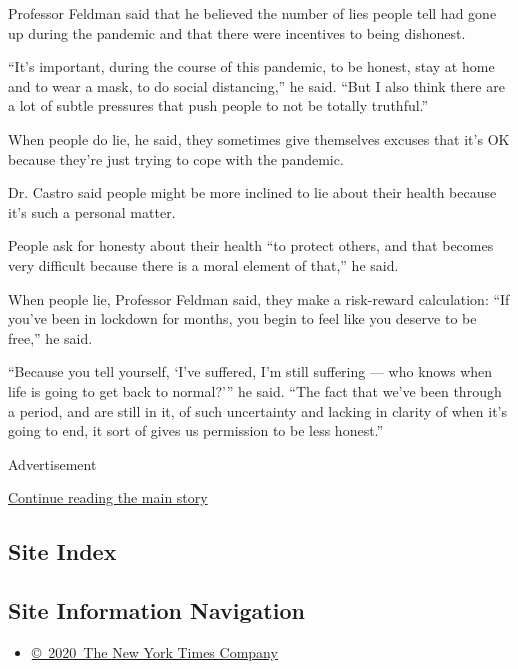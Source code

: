 Professor Feldman said that he believed the number of lies people tell
had gone up during the pandemic and that there were incentives to being
dishonest.

``It's important, during the course of this pandemic, to be honest, stay
at home and to wear a mask, to do social distancing,'' he said. ``But I
also think there are a lot of subtle pressures that push people to not
be totally truthful.''

When people do lie, he said, they sometimes give themselves excuses that
it's OK because they're just trying to cope with the pandemic.

Dr. Castro said people might be more inclined to lie about their health
because it's such a personal matter.

People ask for honesty about their health ``to protect others, and that
becomes very difficult because there is a moral element of that,'' he
said.

When people lie, Professor Feldman said, they make a risk-reward
calculation: ``If you've been in lockdown for months, you begin to feel
like you deserve to be free,'' he said.

``Because you tell yourself, `I've suffered, I'm still suffering --- who
knows when life is going to get back to normal?''' he said. ``The fact
that we've been through a period, and are still in it, of such
uncertainty and lacking in clarity of when it's going to end, it sort of
gives us permission to be less honest.''

Advertisement

\protect\hyperlink{after-bottom}{Continue reading the main story}

\hypertarget{site-index}{%
\subsection{Site Index}\label{site-index}}

\hypertarget{site-information-navigation}{%
\subsection{Site Information
Navigation}\label{site-information-navigation}}

\begin{itemize}
\tightlist
\item
  \href{https://help.nytimes3xbfgragh.onion/hc/en-us/articles/115014792127-Copyright-notice}{©~2020~The
  New York Times Company}
\end{itemize}

